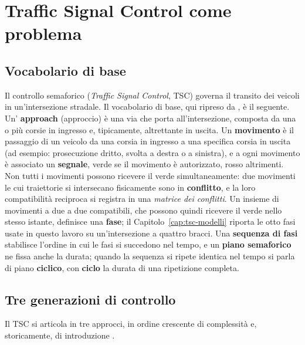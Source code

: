 \section{Traffic Signal Control come problema}
\label{sec:background-tsc}

\subsection{Vocabolario di base}

Il controllo semaforico (\emph{Traffic Signal Control}, TSC) governa il
transito dei veicoli in un'intersezione stradale. Il vocabolario di base,
qui ripreso da \citet{wei2020tscsurvey}, è il seguente. Un'
\textbf{approach} (approccio) è una via che porta all'intersezione,
composta da una o più corsie in ingresso e, tipicamente, altrettante in
uscita. Un \textbf{movimento} è il passaggio di un veicolo da una corsia
in ingresso a una specifica corsia in uscita (ad esempio: prosecuzione
dritto, svolta a destra o a sinistra), e a ogni movimento è associato un
\textbf{segnale}, verde se il movimento è autorizzato, rosso altrimenti.
Non tutti i movimenti possono ricevere il verde simultaneamente: due
movimenti le cui traiettorie si intersecano fisicamente sono in
\textbf{conflitto}, e la loro compatibilità reciproca si registra in una
\emph{matrice dei conflitti}. Un insieme di movimenti a due a due
compatibili, che possono quindi ricevere il verde nello stesso istante,
definisce una \textbf{fase}; il Capitolo~\ref{cap:tsc-modelli} riporta le
otto fasi usate in questo lavoro su un'intersezione a quattro bracci. Una
\textbf{sequenza di fasi} stabilisce l'ordine in cui le fasi si succedono
nel tempo, e un \textbf{piano semaforico} ne fissa anche la durata; quando
la sequenza si ripete identica nel tempo si parla di piano
\textbf{ciclico}, con \textbf{ciclo} la durata di una ripetizione completa.

\subsection{Tre generazioni di controllo}

Il TSC si articola in tre approcci, in ordine crescente di complessità e,
storicamente, di introduzione \citep{shams2018atsctaxonomy}.

